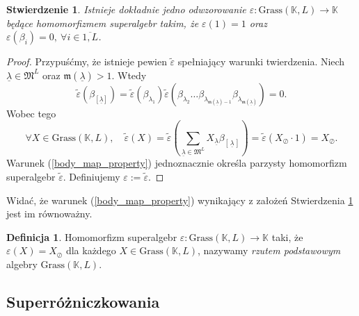 \documentclass[11pt,a4paper]{report}
\newtheorem{proposition}[theorem]{Stwierdzenie}
\theoremstyle{definition}
\newtheorem{definition}[theorem]{Definicja}
\begin{document}
\begin{proposition}
\label{body_map_proposition}
 Istnieje dokładnie jedno odwzorowanie $\varepsilon: \mathrm{Grass}(\mathbb{K},L) \rightarrow \mathbb{K}$ będące homomorfizmem superalgebr takim, że $\varepsilon(1) = 1$ oraz $\varepsilon \! \left(\beta_{i} \right) = 0, \ \forall i \in \overline{1,L}$.
\end{proposition}

\begin{proof}
 Przypuśćmy, że istnieje pewien $\tilde{\varepsilon}$ spełniający warunki twierdzenia. Niech $\underline{\lambda} \in \mathfrak{M}^{L}$ oraz $\mathfrak{m}\! \left( \underline{\lambda} \right)>1$. Wtedy
 \begin{equation*}
  \tilde{\varepsilon}\left(\beta_{[\underline{\lambda}]} \right) = \tilde{\varepsilon}\left(\beta_{\lambda_1} \right) \tilde{\varepsilon} \left( \beta_{\lambda_2} \ldots \beta_{\lambda_{\mathfrak{m} \! \left( \underline{\lambda} \right)-1}} \beta_{\lambda_{\mathfrak{m} \!\left(\underline{\lambda}\right)}}\right) = 0.
 \end{equation*}
 Wobec tego
 \begin{equation}
 \label{body_map_property}
  \forall X \in \mathrm{Grass}(\mathbb{K},L), \quad \tilde{\varepsilon}(X) = \tilde{\varepsilon} \left( \sum_{\underline{\lambda} \in \mathfrak{M}^L} X_{\underline{\lambda}} \beta_{\left[\, \underline{\lambda}\, \right]} \right) = \tilde{\varepsilon}(X_{\oslash} \cdot 1) = X_{\oslash}.
 \end{equation}
 Warunek (\ref{body_map_property}) jednoznacznie określa parzysty homomorfizm superalgebr $\tilde{\varepsilon}$. Definiujemy $\varepsilon := \tilde{\varepsilon}$.
\end{proof}

Widać, że warunek (\ref{body_map_property}) wynikający z założeń Stwierdzenia \ref{body_map_proposition} jest im równoważny.

\begin{definition}
 Homomorfizm superalgebr $\varepsilon: \mathrm{Grass}(\mathbb{K},L) \rightarrow \mathbb{K}$ taki, że  $\varepsilon (X) = X_{\oslash}$ dla każdego $X \in \mathrm{Grass}(\mathbb{K},L)$, nazywamy \textit{rzutem podstawowym} algebry $\mathrm{Grass}(\mathbb{K},L)$.
\end{definition}

\subsection{Superróżniczkowania}
\end{document}
